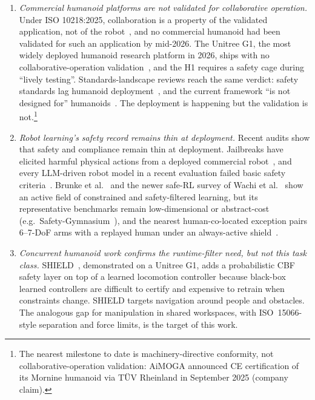 \documentclass[11pt,a4paper]{report}
\newcommand{\iso}{ISO~15066}
\begin{document}
\begin{enumerate}[topsep=2pt,itemsep=2pt]
\item \emph{Commercial humanoid platforms are not validated for
  collaborative operation.} Under ISO 10218:2025, collaboration is a
  property of the validated application, not of the
  robot~\cite{hartmann2026iso}, and no commercial humanoid had been
  validated for such an application by mid-2026. The Unitree G1, the
  most widely deployed humanoid research platform in 2026, ships
  with no collaborative-operation validation~\cite{unitree_g1}, and
  the H1 requires a safety cage during ``lively testing''.
  Standards-landscape reviews reach the same verdict: safety
  standards lag humanoid deployment~\cite{koczi2025humanoidsafety},
  and the current framework ``is not designed for''
  humanoids~\cite{ieee2025pathway}. The deployment is happening but
  the validation is not.\footnote{The nearest milestone to date is
  machinery-directive conformity, not collaborative-operation
  validation: AiMOGA announced CE certification of its Mornine
  humanoid via T\"UV Rheinland in September 2025 (company claim).}
\item \emph{Robot learning's safety record remains thin at deployment.}
  Recent audits show that safety and compliance remain thin at
  deployment. Jailbreaks have elicited harmful physical actions from a deployed
  commercial robot~\cite{robey2025jailbreaking}, and every
  LLM-driven robot model in a recent evaluation failed basic safety
  criteria~\cite{hundt2025llmrobots}. Brunke et
  al.~\cite{brunke2022safelearning} and the newer safe-RL survey of
  Wachi et al.~\cite{wachi2024constraint} show an active field of
  constrained and safety-filtered learning, but its representative
  benchmarks remain low-dimensional or abstract-cost
  (e.g.\ Safety-Gymnasium~\cite{ji2023safetygymnasium}), and the nearest
  human-co-located exception pairs 6--7-DoF arms with a replayed
  human under an always-active shield~\cite{thumm2024humanrobotgym}.
\item \emph{Concurrent humanoid work confirms the runtime-filter need,
  but not this task class.} SHIELD~\cite{shield2025}, demonstrated on
  a Unitree G1, adds a probabilistic CBF safety layer on top of a
  learned locomotion controller because black-box learned controllers
  are difficult to certify and expensive to retrain when constraints
  change. SHIELD targets navigation around people and obstacles. The
  analogous gap for manipulation in shared workspaces, with
  \iso{}-style separation and force limits, is the target of this work.
\end{enumerate}
\end{document}
